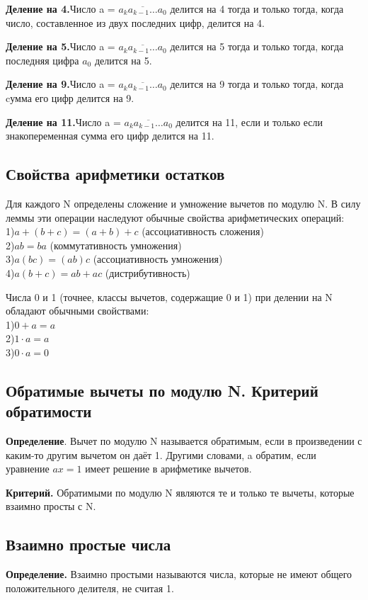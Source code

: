 \documentclass[a4paper, 10pt]{article}
\begin{document}
\textbf{Деление на 4.}Число a = $\overline{a_ka_{k-1}\dots a_0}$ делится на 4 тогда и только тогда, когда число, составленное из двух последних цифр, делится на 4.

\textbf{Деление на 5.}Число a = $\overline{a_ka_{k-1}\dots a_0}$ делится на 5 тогда и только тогда, когда последняя цифра $a_0$ делится на 5.

\textbf{Деление на 9.}Число a = $\overline{a_ka_{k-1}\dots a_0}$ делится на 9 тогда и только тогда, когда cумма его цифр делится на 9.

\textbf{Деление на 11.}Число a = $\overline{a_ka_{k-1}\dots a_0}$ делится на 11, если и только если знакопеременная сумма его цифр делится на 11.

\subsection{Свойства арифметики остатков}
Для каждого N определены сложение и умножение вычетов по модулю N. В силу леммы эти операции наследуют обычные свойства арифметических операций: \\
1)$a + (b + c) = (a + b) + c$ (ассоциативность сложения) \\
2)$ab = ba$ (коммутативность умножения) \\
3)$a(bc) = (ab)c$ (ассоциативность умножения) \\
4)$a(b + c) = ab + ac$ (дистрибутивность)

Числа 0 и 1 (точнее, классы вычетов, содержащие 0 и 1) при делении на N обладают обычными свойствами: \\
1)$0+a=a$ \\
2)$1 \cdot a=a$ \\
3)$0 \cdot a=0$

\subsection{Обратимые вычеты по модулю N. Критерий обратимости}
\textbf{Определение}. Вычет по модулю N называется обратимым, если в произведении с каким-то другим вычетом он даёт 1. Другими словами, a обратим, если уравнение $ax = 1$ имеет решение в арифметике вычетов.

\textbf{Критерий.} Обратимыми по модулю N являются те и только те вычеты, которые взаимно просты с N.

\subsection{Взаимно простые числа}
\textbf{Определение.} Взаимно простыми называются числа, которые не имеют общего положительного делителя, не считая 1.
\end{document}
